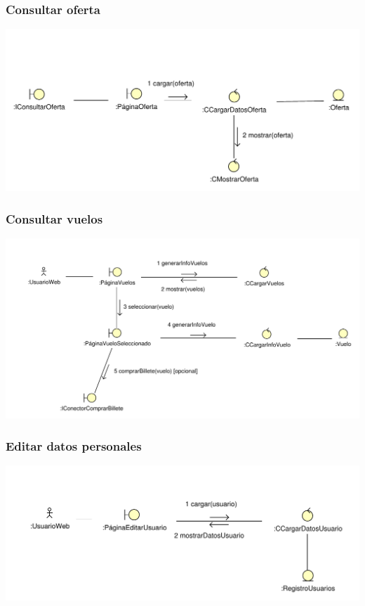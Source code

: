\documentclass[11pt, a4paper, twoside, titlepage]{article}
\begin{document}
			\subsubsection{Consultar oferta}
				\begin{center}
					\includegraphics[scale=.85]{analisis/diagramas/consultaroferta.pdf}
				\end{center}

			\subsubsection{Consultar vuelos}
				\begin{center}
					\includegraphics[scale=.71]{analisis/diagramas/consultarvuelos.pdf}
				\end{center}
			
			\subsubsection{Editar datos personales}
				\begin{center}
					\includegraphics[scale=.86]{analisis/diagramas/editardatospersonales.pdf}
				\end{center}
\end{document}
